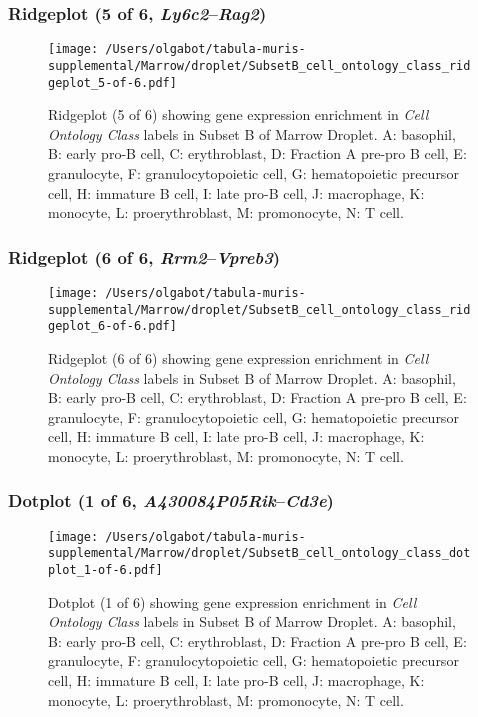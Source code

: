 \clearpage

\subsubsection{Ridgeplot (5 of 6, \emph{Ly6c2}--\emph{Rag2})}
\begin{figure}[h]
\centering
\texttt{[image: /Users/olgabot/tabula-muris-supplemental/Marrow/droplet/SubsetB\_cell\_ontology\_class\_ridgeplot\_5-of-6.pdf]}

\caption{ Ridgeplot (5 of 6)  showing gene expression enrichment in \emph{Cell Ontology Class} labels in Subset B of Marrow Droplet. A: basophil, B: early pro-B cell, C: erythroblast, D: Fraction A pre-pro B cell, E: granulocyte, F: granulocytopoietic cell, G: hematopoietic precursor cell, H: immature B cell, I: late pro-B cell, J: macrophage, K: monocyte, L: proerythroblast, M: promonocyte, N: T cell.}
\end{figure}


\clearpage

\subsubsection{Ridgeplot (6 of 6, \emph{Rrm2}--\emph{Vpreb3})}
\begin{figure}[h]
\centering
\texttt{[image: /Users/olgabot/tabula-muris-supplemental/Marrow/droplet/SubsetB\_cell\_ontology\_class\_ridgeplot\_6-of-6.pdf]}

\caption{ Ridgeplot (6 of 6)  showing gene expression enrichment in \emph{Cell Ontology Class} labels in Subset B of Marrow Droplet. A: basophil, B: early pro-B cell, C: erythroblast, D: Fraction A pre-pro B cell, E: granulocyte, F: granulocytopoietic cell, G: hematopoietic precursor cell, H: immature B cell, I: late pro-B cell, J: macrophage, K: monocyte, L: proerythroblast, M: promonocyte, N: T cell.}
\end{figure}


\clearpage

\subsubsection{Dotplot (1 of 6, \emph{A430084P05Rik}--\emph{Cd3e})}
\begin{figure}[h]
\centering
\texttt{[image: /Users/olgabot/tabula-muris-supplemental/Marrow/droplet/SubsetB\_cell\_ontology\_class\_dotplot\_1-of-6.pdf]}

\caption{ Dotplot (1 of 6)  showing gene expression enrichment in \emph{Cell Ontology Class} labels in Subset B of Marrow Droplet. A: basophil, B: early pro-B cell, C: erythroblast, D: Fraction A pre-pro B cell, E: granulocyte, F: granulocytopoietic cell, G: hematopoietic precursor cell, H: immature B cell, I: late pro-B cell, J: macrophage, K: monocyte, L: proerythroblast, M: promonocyte, N: T cell.}
\end{figure}


